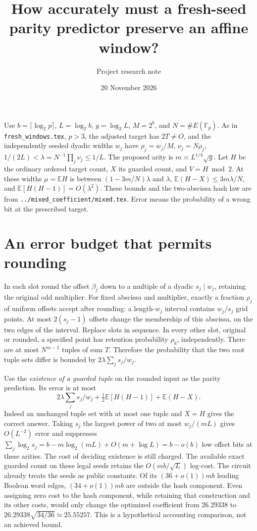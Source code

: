 \documentclass[11pt]{article}
\title{How accurately must a fresh-seed parity predictor preserve an affine window?}
\author{Project research note}
\date{20 November 2026}
\newcommand{\E}{\mathbb E}
\begin{document}
\maketitle

Use $b=\lceil\log_2p\rceil$, $L=\log_2b$, $g=\log_2L$,
$M=2^b$, and $N=\#E(\mathbb F_p)$. As in \texttt{fresh\_windows.tex},
$p>3$, the adjusted target has $2T\ne O$, and the independently
seeded dyadic widths $w_j$ have $\rho_j=w_j/M$, $\nu_j=N\rho_j$,
$1/(2L)<\lambda=N^{-1}\prod_j\nu_j\le1/L$.
The proposed arity is $m\asymp L^{1/4}\sqrt g$. Let $H$ be the
ordinary ordered target count, $X$ its guarded count, and $V=H\bmod2$.
At these widths $\mu=\E H$ is between $(1-3m/N)\lambda$ and
$\lambda$, $\E(H-X)\le3m\lambda/N$, and
$\E[H(H-1)]=O(\lambda^2)$. These bounds and the two-abscissa hash
law are from \texttt{../mixed\_coefficient/mixed.tex}. Error means
the probability of a wrong bit at the prescribed target.

\section{An error budget that permits rounding}
In each slot round the offset $\beta_j$ down to a multiple of a dyadic
$s_j\mid w_j$, retaining the original odd multiplier. For fixed
abscissa and multiplier, exactly a fraction $\rho_j$ of uniform offsets
accept after rounding: a length-$w_j$ interval contains $w_j/s_j$
grid points. At most $2(s_j-1)$ offsets change the membership of this
abscissa, on the two edges of the interval. Replace slots in sequence.
In every other slot, original or rounded, a specified point has
retention probability $\rho_k$, independently. There are at most
$N^{m-1}$ tuples of sum $T$. Therefore the probability that the two
root tuple sets differ is bounded by $2\lambda\sum_j s_j/w_j$.

Use the \emph{existence of a guarded tuple} on the rounded input as the
parity prediction. Its error is at most
\[
 2\lambda\sum_j s_j/w_j+\tfrac12\E[H(H-1)]+\E(H-X).
\]
Indeed an unchanged tuple set with at most one tuple and $X=H$ gives
the correct answer. Taking $s_j$ the largest power of two at most
$w_j/(mL)$ gives $O(L^{-2})$ error and suppresses
$\sum_j\log_2 s_j=b-m\log_2(mL)+O(m+\log L)=b-o(b)$ low offset bits
at these arities. The cost of deciding existence is still charged. The
available exact guarded count on these legal seeds retains the
$O(mb/\sqrt L)$ log-cost. The circuit already treats the seeds as
public constants. Of its $(36+o(1))mb$ leading Boolean word edges,
$(34+o(1))mb$ are outside the hash component.
Even assigning zero cost to the hash component, while retaining that
construction and its other costs, would only change the optimized
coefficient from $26.29338$ to $26.29338\sqrt{34/36}\simeq25.55257$.
This is a hypothetical accounting comparison, not an achieved bound.
\end{document}
